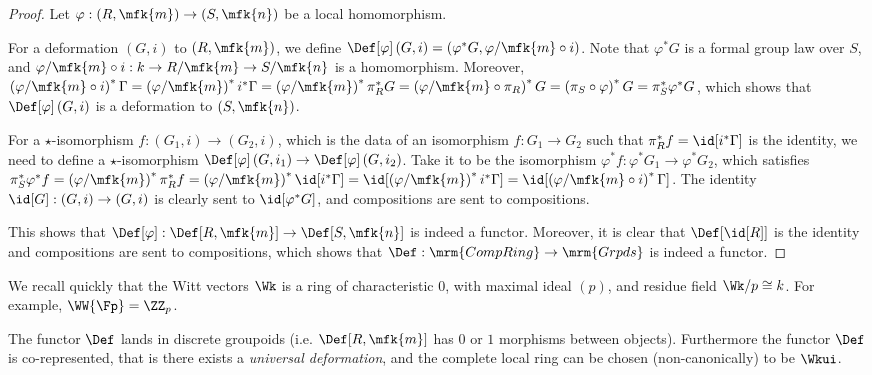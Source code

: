 \begin{proof}
	Let $\varphi: \left(R, \mfk{m}\right) \to \left(S, \mfk{n}\right)$ be a local homomorphism.
	
	For a deformation $\left(G, i\right)$ to $\left(R, \mfk{m}\right)$, we define
	$
	\Def[\varphi]\left(G, i\right)
	= \left(\varphi^* G, \varphi/\mfk{m} \circ i\right)
	$.
	Note that $\varphi^* G$ is a formal group law over $S$, and $\varphi/\mfk{m} \circ i: k \to R/\mfk{m} \to S/\mfk{n}$ is a homomorphism.
	Moreover,
	$
	\left(\varphi/\mfk{m} \circ i\right)^* \Gamma
	= \left(\varphi/\mfk{m}\right)^* i^* \Gamma
	= \left(\varphi/\mfk{m}\right)^* \pi_R^* G
	= \left(\varphi/\mfk{m} \circ \pi_R\right)^* G
	= \left(\pi_S \circ \varphi\right)^* G
	= \pi_S^* \varphi^* G
	$,
	which shows that $\Def[\varphi]\left(G, i\right)$ is a deformation to $\left(S, \mfk{n}\right)$.
	
	For a $\star$-isomorphism $f: \left(G_1, i\right) \to \left(G_2, i\right)$, which is the data of an isomorphism $f: G_1 \to G_2$ such that $\pi_R^* f = \id[i^*\Gamma]$ is the identity, we need to define a $\star$-isomorphism $\Def[\varphi]\left(G, i_1\right) \to \Def[\varphi]\left(G, i_2\right)$.
	Take it to be the isomorphism $\varphi^* f: \varphi^* G_1 \to \varphi^* G_2$, which satisfies
	$
	\pi_S^* \varphi^* f
	= \left(\varphi/\mfk{m}\right)^* \pi_R^* f
	= \left(\varphi/\mfk{m}\right)^* \id[i^*\Gamma]
	= \id[\left(\varphi/\mfk{m}\right)^* i^*\Gamma]
	= \id[\left(\varphi/\mfk{m} \circ i \right)^*\Gamma]
	$.
	The identity $\id[G]: \left(G, i\right) \to \left(G, i\right)$ is clearly sent to $\id[\varphi^* G]$, and compositions are sent to compositions.
	
	This shows that $\Def[\varphi]: \Def[R, \mfk{m}] \to \Def[S, \mfk{n}]$ is indeed a functor.
	Moreover, it is clear that $\Def[{\id[R]}]$ is the identity and compositions are sent to compositions, which shows that $\Def: \mrm{CompRing} \to \mrm{Grpds}$ is indeed a functor.
\end{proof}

\begin{remark}
	We recall quickly that the Witt vectors $\Wk$ is a ring of characteristic $0$, with maximal ideal $\left(p\right)$, and residue field $\Wk/p \cong k$.
	For example, $\WW{\Fp} = \ZZ_p$.
\end{remark}

\begin{theorem}
	The functor $\Def$ lands in discrete groupoids (i.e. $\Def[R, \mfk{m}]$ has $0$ or $1$ morphisms between objects).
	Furthermore the functor $\Def$ is co-represented, that is there exists a \emph{universal deformation}, and the complete local ring can be chosen (non-canonically) to be $\Wkui$.
\end{theorem}

